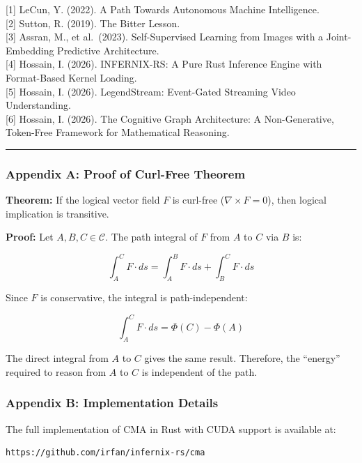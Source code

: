 \documentclass[
  11pt,
  a4paper,
]{article}
\begin{document}
{[}1{]} LeCun, Y. (2022). A Path Towards Autonomous Machine
Intelligence.\\
{[}2{]} Sutton, R. (2019). The Bitter Lesson.\\
{[}3{]} Assran, M., et al.~(2023). Self-Supervised Learning from Images
with a Joint-Embedding Predictive Architecture.\\
{[}4{]} Hossain, I. (2026). INFERNIX-RS: A Pure Rust Inference Engine
with Format-Based Kernel Loading.\\
{[}5{]} Hossain, I. (2026). LegendStream: Event-Gated Streaming Video
Understanding.\\
{[}6{]} Hossain, I. (2026). The Cognitive Graph Architecture: A
Non-Generative, Token-Free Framework for Mathematical Reasoning.

\begin{center}\rule{0.5\linewidth}{0.5pt}\end{center}

\subsubsection{Appendix A: Proof of Curl-Free
Theorem}\label{appendix-a-proof-of-curl-free-theorem}

\textbf{Theorem:} If the logical vector field \(F\) is curl-free
(\(\nabla \times F = 0\)), then logical implication is transitive.

\textbf{Proof:} Let \(A, B, C \in \mathcal{C}\). The path integral of
\(F\) from \(A\) to \(C\) via \(B\) is:

\[\int_A^C F \cdot ds = \int_A^B F \cdot ds + \int_B^C F \cdot ds\]

Since \(F\) is conservative, the integral is path-independent:

\[\int_A^C F \cdot ds = \Phi(C) - \Phi(A)\]

The direct integral from \(A\) to \(C\) gives the same result.
Therefore, the ``energy'' required to reason from \(A\) to \(C\) is
independent of the path.

\subsubsection{Appendix B: Implementation
Details}\label{appendix-b-implementation-details}

The full implementation of CMA in Rust with CUDA support is available
at:

\begin{verbatim}
https://github.com/irfan/infernix-rs/cma
\end{verbatim}
\end{document}
